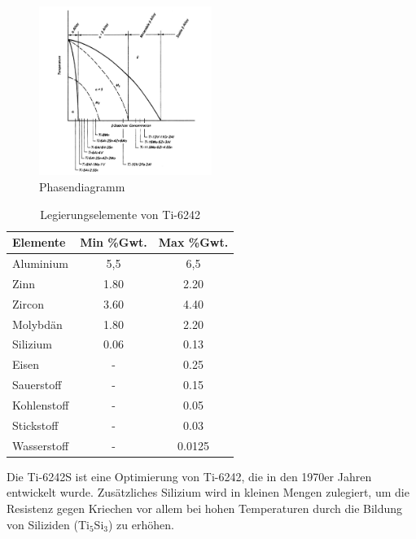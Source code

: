 \begin{figure}
	\centering
	\includegraphics[width=0.5\textwidth]{Bilder/Phasendiagram}
    \caption{Phasendiagramm \cite{M.J.Donachie.2010}}
	\label{tab:PD-Ti6242}
\end{figure}





\begin{table}
	
	\centering	
	\begin{tabular}{|l |c |c|}
		\hline
		\hspace{20ex}Elemente \hspace{20ex} & Min \%Gwt. & Max \%Gwt.\\
		\hline
		Aluminium&5,5&6,5\\
		Zinn&1.80&2.20\\
		Zircon&3.60&4.40\\
		Molybdän&1.80&2.20\\
		Silizium &0.06&0.13\\
		Eisen&-&0.25\\
		Sauerstoff&-&0.15\\
		Kohlenstoff&	-&	0.05\\
		Stickstoff&-&0.03\\
		Wasserstoff&-&0.0125\\
		
		
		\hline
	\end{tabular}
	\caption{Legierungselemente von Ti-6242 \cite{M.J.Donachie.2010}}
	\label{tab:Zusammensetzung}
\end{table}


Die Ti-6242S ist eine Optimierung von Ti-6242, die in den 1970er Jahren  entwickelt wurde. Zusätzliches Silizium wird in kleinen Mengen zulegiert, um die Resistenz gegen Kriechen vor allem bei hohen Temperaturen durch die Bildung von Siliziden (Ti$_5$Si$_3$) zu erhöhen.%

